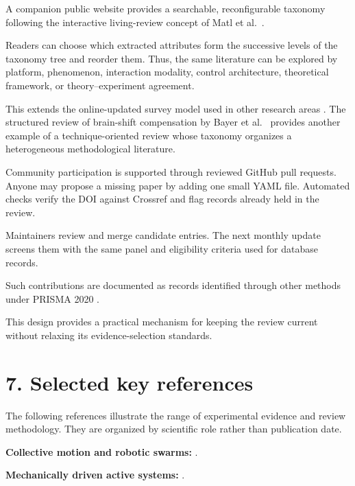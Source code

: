 A companion public website provides
a searchable, reconfigurable taxonomy
following the interactive living-review
concept of Matl et al.~\cite{Matl2017vascular}.

Readers can choose which extracted
attributes form the successive levels
of the taxonomy tree and reorder them.
Thus, the same literature can be explored
by platform, phenomenon, interaction
modality, control architecture,
theoretical framework, or
theory--experiment agreement.

This extends the online-updated survey
model used in other research areas
\cite{Litjens2017survey}.
The structured review of brain-shift compensation
by Bayer et al.~\cite{Bayer2017brainshift} provides
another example of a technique-oriented review
whose taxonomy organizes a heterogeneous
methodological literature.

Community participation is supported
through reviewed GitHub pull requests.
Anyone may propose a missing paper
by adding one small YAML file.
Automated checks verify the DOI
against Crossref and flag records
already held in the review.

Maintainers review and merge candidate
entries. The next monthly update
screens them with the same panel
and eligibility criteria used
for database records.

Such contributions are documented
as records identified through
other methods under PRISMA 2020
\cite{Page2021prisma}.

This design provides a practical
mechanism for keeping the review
current without relaxing its
evidence-selection standards.

\section*{7. Selected key references}

The following references illustrate the
range of experimental evidence and
review methodology. They are organized
by scientific role rather than
publication date.

\noindent\textbf{Collective motion and robotic swarms:}
\cite{Turgut2008selforganizedflocka,Tarcai2011patternstransition,Rubenstein2014programmableselfas,Vsrhelyi2018optimizedflockingo,Zhou2024anticipationpromote}.

\noindent\textbf{Mechanically driven active systems:}
\cite{Welch2018aggregatesuppressio,Deblais2019howtoforceanarmy,Chvykov2020lowrattlingapred,Barone2024experimentalandnum,Wang2025hyperuniformnetwork}.

